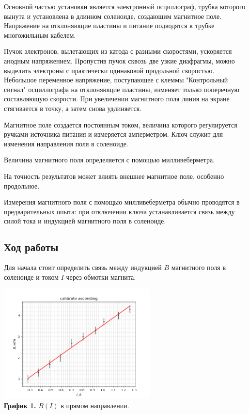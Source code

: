 \documentclass[a4paper, 12pt]{article}
\begin{document}
Основной частью установки является электронный осциллограф, трубка которого вынута и установлена в длинном соленоиде, создающим магнитное поле. Напряжение на отклоняющие пластины и питание подводятся к трубке многожильным кабелем.

Пучок электронов, вылетающих из катода с разными скоростями, ускоряется анодным напряжением. Пропустив пучок сквозь две узкие диафрагмы, можно выделить электроны с практически одинаковой продольной скоростью. Небольшое переменное напряжение, поступающее с клеммы "Контрольный сигнал" осциллографа на отклоняющие пластины, изменяет только поперечную составляющую скорости. При увеличении магнитного поля линия на экране стягивается в точку, а затем снова удлиняется.

Магнитное поле создается постоянным током, величина которого регулируется ручками источника питания и измеряется амперметром. Ключ служит для изменения направления поля в соленоиде.

Величина магнитного поля определяется с помощью милливеберметра.

На точность результатов может влиять внешнее магнитное поле, особенно продольное.

Измерения магнитного поля с помощью милливеберметра обычно проводятся в предварительных опыта: при отключении ключа устанавливается связь между силой тока и индукцией магнитного поля в соленоиде.

\newpage
\;
\subsection*{Ход работы}

Для начала стоит определить связь между индукцией $B$ магнитного поля в соленоиде и током $I$ через обмотки магнита.

\begin{center}
    \includegraphics[width = 0.6\textwidth]{data/focus/graphs/ascend_calibrate.png}\\
    \textbf{График 1.} $B (I)$ в прямом направлении.
\end{center}
\end{document}
